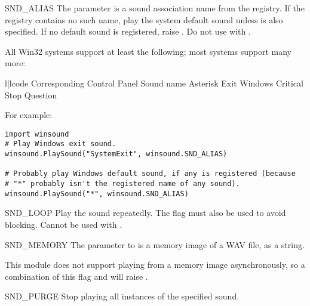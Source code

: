 \begin{datadesc}{SND_ALIAS}
  The  parameter is a sound association name from the
  registry.  If the registry contains no such name, play the system
  default sound unless  is also specified.
  If no default sound is registered, raise .
  Do not use with .

  All Win32 systems support at least the following; most systems support
  many more:

\begin{tableii}{l|l}{code}
               { }
               {Corresponding Control Panel Sound name}
     {Asterisk}
         {Exit Windows}
         {Critical Stop}
     {Question}
\end{tableii}

  For example:

\begin{verbatim}
import winsound
# Play Windows exit sound.
winsound.PlaySound("SystemExit", winsound.SND_ALIAS)

# Probably play Windows default sound, if any is registered (because
# "*" probably isn't the registered name of any sound).
winsound.PlaySound("*", winsound.SND_ALIAS)
\end{verbatim}
\end{datadesc}

\begin{datadesc}{SND_LOOP}
  Play the sound repeatedly.  The  flag must also
  be used to avoid blocking.  Cannot be used with .
\end{datadesc}

\begin{datadesc}{SND_MEMORY}
  The  parameter to  is a memory
  image of a WAV file, as a string.

    This module does not support playing from a memory
  image asynchronously, so a combination of this flag and
   will raise .
\end{datadesc}

\begin{datadesc}{SND_PURGE}
  Stop playing all instances of the specified sound.
\end{datadesc}

